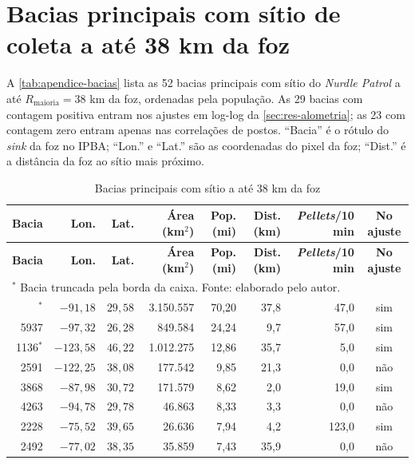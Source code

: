 \chapter{Bacias principais com sítio de coleta a até 38 km da foz}
\label{apendice:bacias}

A \autoref{tab:apendice-bacias} lista as 52 bacias principais com sítio do \textit{Nurdle Patrol} a até $R_{\mathrm{maioria}} = 38$ km da foz, ordenadas pela população. As 29 bacias com contagem positiva entram nos ajustes em log-log da \autoref{sec:res-alometria}; as 23 com contagem zero entram apenas nas correlações de postos. ``Bacia'' é o rótulo do \textit{sink} da foz no IPBA; ``Lon.'' e ``Lat.'' são as coordenadas do pixel da foz; ``Dist.'' é a distância da foz ao sítio mais próximo.

{\small
\begin{longtable}{rrrrrrrc}
	\caption{\label{tab:apendice-bacias}Bacias principais com sítio a até 38 km da foz} \\
	\toprule
	\textbf{Bacia} & \textbf{Lon.} & \textbf{Lat.} & \textbf{Área (km$^2$)} & \textbf{Pop. (mi)} & \textbf{Dist. (km)} & \textbf{\textit{Pellets}/10 min} & \textbf{No ajuste} \\
	\midrule
	\endfirsthead
	\toprule
	\textbf{Bacia} & \textbf{Lon.} & \textbf{Lat.} & \textbf{Área (km$^2$)} & \textbf{Pop. (mi)} & \textbf{Dist. (km)} & \textbf{\textit{Pellets}/10 min} & \textbf{No ajuste} \\
	\midrule
	\endhead
	\bottomrule
	\multicolumn{8}{l}{\footnotesize $^{*}$ Bacia truncada pela borda da caixa. Fonte: elaborado pelo autor.} \\
	\endlastfoot
		4479$^{*}$ & $-91{,}18$ & $29{,}58$ & 3.150.557 & 70,20 & 37,8 & 47,0 & sim \\
		5937 & $-97{,}32$ & $26{,}28$ & 849.584 & 24,24 & 9,7 & 57,0 & sim \\
		1136$^{*}$ & $-123{,}58$ & $46{,}22$ & 1.012.275 & 12,86 & 35,7 & 5,0 & sim \\
		2591 & $-122{,}25$ & $38{,}08$ & 177.542 & 9,85 & 21,3 & 0,0 & não \\
		3868 & $-87{,}98$ & $30{,}72$ & 171.579 & 8,62 & 2,0 & 19,0 & sim \\
		4263 & $-94{,}78$ & $29{,}78$ & 46.863 & 8,33 & 3,3 & 0,0 & não \\
		2228 & $-75{,}52$ & $39{,}65$ & 26.636 & 7,94 & 4,2 & 123,0 & sim \\
		2492 & $-77{,}02$ & $38{,}35$ & 35.859 & 7,43 & 35,9 & 0,0 & não \\

\end{longtable}}

